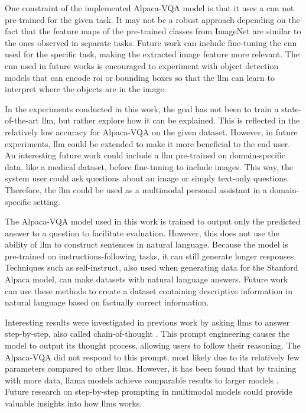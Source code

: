 
    One constraint of the implemented Alpaca-VQA model is that it uses a \gls{cnn} not pre-trained for the given task. It may not be a robust approach depending on the fact that the feature maps of the pre-trained classes from ImageNet are similar to the ones observed in separate tasks. 
    Future work can include fine-tuning the \gls{cnn} used for the specific task, making the extracted image feature more relevant. 
    The \gls{cnn} used in future works is encouraged to experiment with object detection models that can encode \gls{roi} or bounding boxes so that the \gls{llm} can learn to interpret where the objects are in the image.

    In the experiments conducted in this work, the goal has not been to train a state-of-the-art \gls{llm}, but rather explore how it can be explained. This is reflected in the relatively low accuracy for Alpaca-VQA on the given dataset.
    However, in future experiments, \gls{llm} could be extended to make it more beneficial to the end user.
    An interesting future work could include a \gls{llm} pre-trained on domain-specific data, like a medical dataset, before fine-tuning to include images. This way, the system user could ask questions about an image or simply text-only questions. Therefore, the \gls{llm} could be used as a multimodal personal assistant in a domain-specific setting. 

    The Alpaca-VQA model used in this work is trained to output only the predicted answer to a question to facilitate evaluation. However, this does not use the ability of \gls{llm} to construct sentences in natural language. Because the model is pre-trained on instructions-following tasks, it can still generate longer responses. Techniques such as self-instruct, also used when generating data for the Stanford Alpaca model, can make datasets with natural language answers. Future work can use these methods to create a dataset containing descriptive information in natural language based on factually correct information. 

    Interesting results were investigated in previous work by asking \glspl{llm} to answer step-by-step, also called chain-of-thought \cite{lievinCanLargeLanguage2023, weiChainofThoughtPromptingElicits2023}. This prompt engineering causes the model to output its thought process, allowing users to follow their reasoning. The Alpaca-VQA did not respond to this prompt, most likely due to its relatively few parameters compared to other \glspl{llm}. However, it has been found that by training with more data, \gls{llama} models achieve comparable results to larger models \cite{touvronLLaMAOpenEfficient2023}. Future research on step-by-step prompting in multimodal models could provide valuable insights into how \glspl{llm} works.
    

